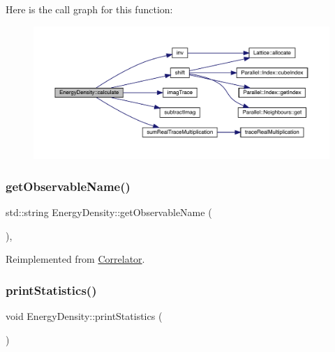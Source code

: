 Here is the call graph for this function\+:\nopagebreak
\begin{figure}[H]
\begin{center}
\leavevmode
\includegraphics[width=350pt]{class_energy_density_ae8e5e29257104d881bcabeadc3b2c9e7_cgraph}
\end{center}
\end{figure}
\mbox{\label{class_energy_density_a59b320595bca439333d36e3753ca07f0}} 
\subsubsection{\texorpdfstring{getObservableName()}{getObservableName()}}
{\footnotesize\ttfamily std\+::string Energy\+Density\+::get\+Observable\+Name (\begin{DoxyParamCaption}{ }\end{DoxyParamCaption})\hspace{0.3cm}{\ttfamily [inline]}, {\ttfamily [virtual]}}



Reimplemented from \mbox{\hyperlink{class_correlator_ad1fa59e864917c3e48da037f90c3488f}{Correlator}}.

\mbox{\label{class_energy_density_ad108e32bc670f17f15b4ed433d8bbec7}} 
\subsubsection{\texorpdfstring{printStatistics()}{printStatistics()}}
{\footnotesize\ttfamily void Energy\+Density\+::print\+Statistics (\begin{DoxyParamCaption}{ }\end{DoxyParamCaption})\hspace{0.3cm}{\ttfamily [virtual]}}



